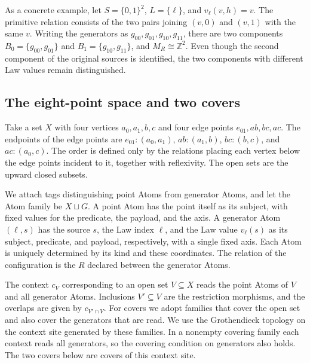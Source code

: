 As a concrete example, let $S=\{0,1\}^2$, $L=\{\ell\}$, and $v_\ell(v,h)=v$. The
primitive relation consists of the two pairs joining $(v,0)$ and $(v,1)$ with the same
$v$. Writing the generators as $g_{00},g_{01},g_{10},g_{11}$, there are two components
$B_0=\{g_{00},g_{01}\}$ and $B_1=\{g_{10},g_{11}\}$, and $M_R\cong\mathbb{Z}^2$. Even
though the second component of the original sources is identified, the two components
with different Law values remain distinguished.

\subsection*{The eight-point space and two covers}

\begin{construction}\label{cons:2.37}

Take a set $X$ with four vertices $a_0,a_1,b,c$ and four edge points $e_{01},ab,bc,ac$.
The endpoints of the edge points are $e_{01}:(a_0,a_1)$, $ab:(a_1,b)$, $bc:(b,c)$, and
$ac:(a_0,c)$. The order is defined only by the relations placing each vertex below the
edge points incident to it, together with reflexivity. The open sets are the upward
closed subsets.

We attach tags distinguishing point Atoms from generator Atoms, and let the Atom family
be $X\sqcup G$. A point Atom has the point itself as its subject, with fixed values for
the predicate, the payload, and the axis. A generator Atom $(\ell,s)$ has the source $s$,
the Law index $\ell$, and the Law value $v_\ell(s)$ as its subject, predicate, and
payload, respectively, with a single fixed axis. Each Atom is uniquely determined by its
kind and these coordinates. The relation of the configuration is the $R$ declared between
the generator Atoms.

The context $c_V$ corresponding to an open set $V\subseteq X$ reads the point Atoms of
$V$ and all generator Atoms. Inclusions $V'\subseteq V$ are the restriction morphisms,
and the overlaps are given by $c_{V'\cap V}$. For covers we adopt families that cover the
open set and also cover the generators that are read. We use the Grothendieck topology on
the context site generated by these families. In a nonempty covering family each context
reads all generators, so the covering condition on generators also holds. The two covers
below are covers of this context site.

\end{construction}

